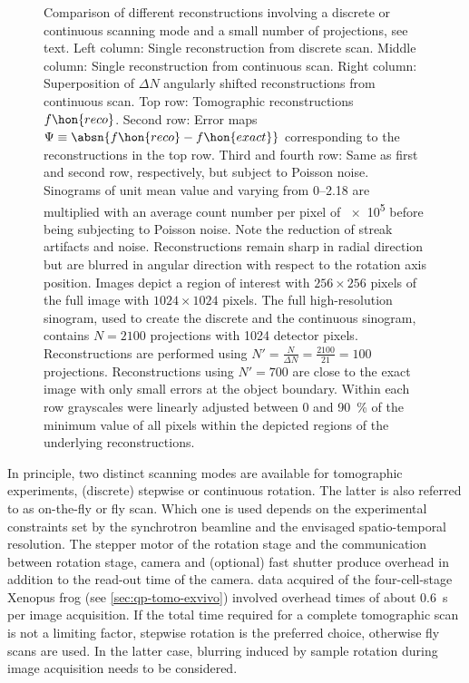 \documentclass[
twoside,
openright,
titlepage,
numbers=noenddot,
headinclude,
fleqn,
a4paper,
footinclude=true,
cleardoublepage=empty,
abstractoff,
BCOR=5mm,
paper=a4,
fontsize=11pt,
british,ngerman,american,
]{scrreprt}
\begin{document}
\begin{figure}
  \caption[Comparison of tomographic reconstructions involving a
  discrete or continuous scanning mode.]{Comparison of different
    reconstructions involving a discrete or continuous scanning mode
    and a small number of projections, see text.  Left column: Single
    reconstruction from discrete scan.  Middle column: Single
    reconstruction from continuous scan.  Right column: Superposition
    of $\Delta N$ angularly shifted reconstructions from continuous
    scan.  Top row: Tomographic reconstructions $f\hon{reco}$.  Second
    row: Error maps $\Psi \equiv \absn{ f\hon{reco} - f\hon{exact} }$
    corresponding to the reconstructions in the top row.  Third and
    fourth row: Same as first and second row, respectively, but
    subject to Poisson noise.  Sinograms of unit mean value and
    varying from \numrange{0}{2.18} are multiplied with an average
    count number per pixel of \num{e5} before being subjecting to
    Poisson noise.  Note the reduction of streak artifacts and noise.
    Reconstructions remain sharp in radial direction but are blurred
    in angular direction with respect to the rotation axis position.
    Images depict a region of interest with $\num{256}\times\num{256}$
    pixels of the full image with $\num{1024}\times\num{1024}$ pixels.
    The full high-resolution sinogram, used to create the discrete and
    the continuous sinogram, contains $N=\num{2100}$ projections with
    \num{1024} detector pixels.  Reconstructions are performed using
    $N'=\frac{N}{\Delta N}=\frac{\num{2100}}{\num{21}}=\num{100}$
    projections.  Reconstructions using $N'=\num{700}$ are close to
    the exact image with only small errors at the object boundary.
    Within each row grayscales were linearly adjusted between \num{0}
    and \SI{90}{\percent} of the minimum value of all pixels within
    the depicted regions of the underlying reconstructions. }
  \label{fig:tomo-cont-vs-step}
\end{figure}
In principle, two distinct scanning modes are available for
tomographic experiments, \ie{} (discrete) stepwise or continuous
rotation.  The latter is also referred to as on-the-fly or fly scan.
Which one is used depends on the experimental constraints set by the
synchrotron beamline and the envisaged spatio-temporal resolution.
The stepper motor of the rotation stage and the communication between
rotation stage, camera and (optional) fast shutter produce overhead in
addition to the read-out time of the camera.  \Eg{} data acquired of
the four-cell-stage Xenopus frog (see \cref{sec:qp-tomo-exvivo})
involved overhead times of about \SI{0.6}{s} per image acquisition.
If the total time required for a complete tomographic scan is not a
limiting factor, stepwise rotation is the preferred choice, otherwise
fly scans are used.  In the latter case, blurring induced by sample
rotation during image acquisition needs to be considered.
\end{document}
